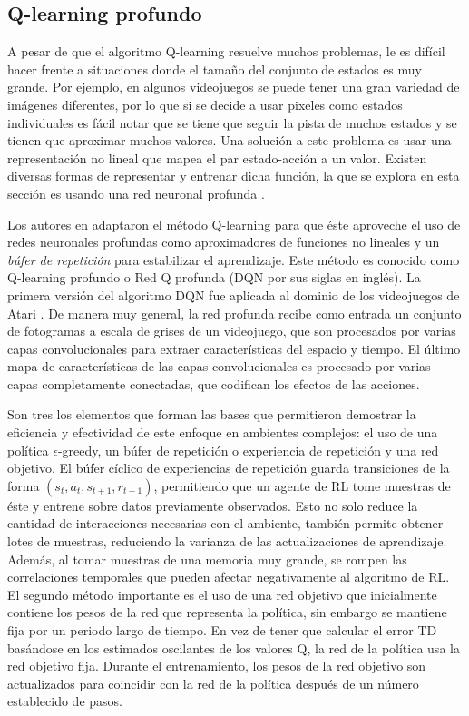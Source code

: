 \subsection{Q-learning profundo}

A pesar de que el algoritmo Q-learning resuelve muchos problemas, 
le es difícil hacer frente a situaciones donde el tamaño del conjunto de estados
es muy grande. Por ejemplo, en algunos videojuegos se puede tener una gran variedad
de imágenes diferentes, por lo que  si se decide a usar pixeles como 
estados individuales es fácil notar que se tiene que seguir la pista de muchos
estados y se tienen que aproximar muchos valores. 
Una solución a este problema es usar una representación no lineal que mapea 
el par estado-acción a un valor.
Existen diversas formas de representar y entrenar dicha función, la que 
se explora en esta sección es usando una red neuronal profunda \cite{lapan_2020, Goodfellow-et-al-2016}.

Los autores en \cite{mnih2013playing} adaptaron el método Q-learning 
para que éste aproveche el uso de redes neuronales profundas como aproximadores
de funciones no lineales y un \textit{búfer de repetición} para estabilizar 
el aprendizaje. Este método es conocido como Q-learning profundo o Red Q profunda (DQN por sus siglas en inglés).
La primera versión del algoritmo DQN fue aplicada al dominio de los videojuegos de Atari \cite{bellemare2013arcade}. De manera muy general, la red profunda recibe como entrada un conjunto de fotogramas a escala de grises de un videojuego, que son procesados por varias capas convolucionales para
extraer características del espacio y tiempo. El último mapa de características
de las capas convolucionales es procesado por varias capas completamente conectadas, que codifican los efectos de las acciones.

Son tres los elementos que forman las bases que permitieron demostrar
la eficiencia y efectividad de este enfoque en ambientes complejos: el uso de una política $\epsilon$-greedy, un búfer de repetición o experiencia de repetición \cite{lin1993reinforcement} y una red objetivo.
El búfer cíclico de experiencias de repetición guarda transiciones de la forma 
$(s_t, a_t, s_{t+1}, r_{t+1})$, permitiendo que un agente de RL 
tome muestras de éste y entrene sobre datos previamente observados. 
Esto no solo reduce la cantidad de interacciones necesarias con el ambiente,
también permite obtener lotes de muestras, reduciendo la varianza de 
las actualizaciones de aprendizaje. Además, al tomar muestras de una memoria
muy grande, se rompen las correlaciones temporales que pueden afectar negativamente al algoritmo de RL.
El segundo método importante es el uso de una red objetivo que inicialmente contiene los pesos de la red que representa la política, sin embargo se mantiene
fija por un periodo largo de tiempo.
En vez de tener que calcular el error TD basándose en los estimados
oscilantes de los valores Q, la red de la política usa la red objetivo fija.
Durante el entrenamiento, los pesos de la red objetivo son actualizados 
para coincidir con la red de la política después de un número establecido de pasos.



